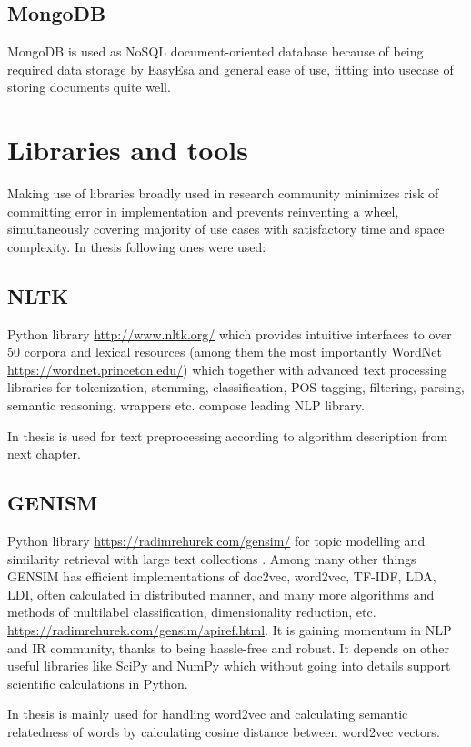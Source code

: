\documentclass[a4paper, 12pt, oneside]{Thesis} %
\begin{document}
\subsection{MongoDB} MongoDB is used as NoSQL document-oriented database because of being required data storage by EasyEsa and general ease of use, fitting into usecase of storing documents quite well.

\section{Libraries and tools} Making use of libraries broadly used in research community minimizes risk of committing error in implementation and prevents reinventing a wheel, simultaneously covering majority of use cases with satisfactory time and space complexity. In thesis following ones were used:

\subsection{NLTK} Python library \url{http://www.nltk.org/} which provides intuitive interfaces to over 50 corpora and lexical resources (among them the most importantly WordNet \url{https://wordnet.princeton.edu/}) which together with advanced text processing libraries for tokenization, stemming, classification, POS-tagging, filtering, parsing, semantic reasoning, wrappers etc. compose leading NLP library.

In thesis is used for text preprocessing according to algorithm description from next chapter.

\subsection{GENISM} Python library \url{https://radimrehurek.com/gensim/} for topic modelling and similarity retrieval with large text collections \cite{rehurek_lrec}. Among many other things GENSIM has efficient implementations of doc2vec, word2vec, TF-IDF, LDA, LDI, often calculated in distributed manner, and many more algorithms and methods of multilabel classification, dimensionality reduction, etc. \url{https://radimrehurek.com/gensim/apiref.html}. It is gaining momentum in NLP and IR community, thanks to being hassle-free and robust. It depends on other useful libraries like SciPy and NumPy which without going into details support scientific calculations in Python. 

In thesis is mainly used for handling word2vec and calculating semantic relatedness of words by calculating cosine distance between word2vec vectors.
\end{document}
